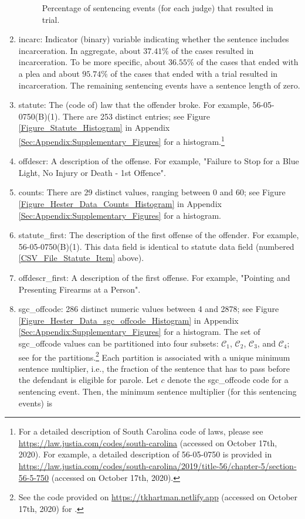 \documentclass[11pt, oneside]{article}   	%
\theoremstyle{ModifiedStyle}
\begin{document}
\begin{enumerate}
\begin{figure}[H]
\begin{minipage}{\textwidth}
			\vspace{-4mm}
			\caption{Percentage of sentencing events (for each judge) that resulted in trial.}
			\label{Figure_Hester_Data_Judge_Trial_Percentage_Histogram}
		\end{minipage}
	\end{figure}
	\item incarc: Indicator (binary) variable indicating whether the sentence includes incarceration. In aggregate, about $37.41\%$ of the cases resulted in incarceration. To be more specific, about $36.55\%$ of the cases that ended with a plea and about $95.74\%$ of the cases that ended with a trial resulted in incarceration. The remaining sentencing events have a sentence length of zero.
	\item statute: The (code of) law that the offender broke. For example, 56-05-0750(B)(1). There are 253 distinct entries; see Figure \ref{Figure_Statute_Histogram} in Appendix \ref{Sec:Appendix:Supplementary_Figures} for a histogram.\footnote{For a detailed description of South Carolina code of laws, please see \url{https://law.justia.com/codes/south-carolina} (accessed on October 17th, 2020). For example, a detailed description of 56-05-0750 is provided in \url{https://law.justia.com/codes/south-carolina/2019/title-56/chapter-5/section-56-5-750} (accessed on October 17th, 2020).}
	\label{CSV_File_Statute_Item}
	\item offdescr: A description of the offense. For example, "Failure to Stop for a Blue Light, No Injury or Death - 1st Offence".
	\item counts: There are 29 distinct values, ranging between 0 and 60; see Figure \ref{Figure_Hester_Data_Counts_Histogram} in Appendix \ref{Sec:Appendix:Supplementary_Figures} for a histogram.
	\item statute\_first: The description of the first offense of the offender. For example, 56-05-0750(B)(1). This data field is identical to statute data field (numbered \ref{CSV_File_Statute_Item} above).
	\item offdescr\_first: A description of the first offense. For example, "Pointing and Presenting Firearms at a Person".
	\item sgc\_offcode: 286 distinct numeric values between 4 and 2878; see Figure \ref{Figure_Hester_Data_sgc_offcode_Histogram} in Appendix \ref{Sec:Appendix:Supplementary_Figures} for a histogram. The set of sgc\_offcode values can be partitioned into four subsets: $\mathcal{C}_1$, $\mathcal{C}_2$, $\mathcal{C}_3$, and $\mathcal{C}_4$; see \citet{Hester_Hartman_2017} for the partitions.\footnote{See the code provided on \url{https://tkhartman.netlify.app} (accessed on October 17th, 2020) for \citet{Hester_Hartman_2017}.} Each partition is associated with a unique minimum sentence multiplier, i.e., the fraction of the sentence that has to pass before the defendant is eligible for parole. Let $c$ denote the sgc\_offcode code for a sentencing event. Then, the minimum sentence multiplier (for this sentencing events) is

\end{enumerate}
\end{document}
